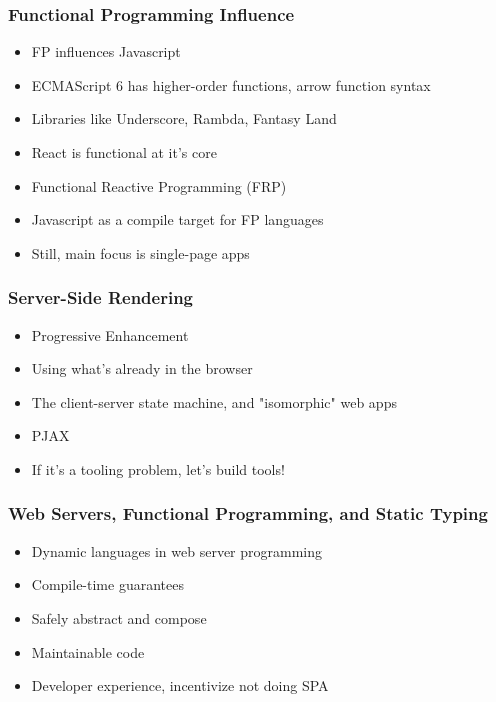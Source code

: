 \begin{frame}
  \frametitle{Functional Programming Influence}
  \begin{itemize}
    \pause
    \item<+-> FP influences Javascript
    \item<+-> ECMAScript 6 has higher-order functions, arrow function syntax
    \item<+-> Libraries like Underscore, Rambda, Fantasy Land
    \item<+-> React is functional at it's core
    \item<+-> Functional Reactive Programming (FRP)
    \item<+-> Javascript as a compile target for FP languages
    \item<+-> Still, main focus is single-page apps
  \end{itemize}
\end{frame}

\begin{frame}
\end{frame}

\begin{frame}
  \frametitle{Server-Side Rendering}
  \begin{itemize}
    \pause
    \item<+-> Progressive Enhancement
    \item<+-> Using what's already in the browser
    \item<+-> The client-server state machine, and "isomorphic" web apps
    \item<+-> PJAX
    \item<+-> If it's a tooling problem, let's build tools!
  \end{itemize}
\end{frame}

\begin{frame}
\end{frame}

\begin{frame}
  \frametitle{Web Servers, Functional Programming, and Static Typing}
  \begin{itemize}
    \pause
    \item<+-> Dynamic languages in web server programming
    \item<+-> Compile-time guarantees
    \item<+-> Safely abstract and compose
    \item<+-> Maintainable code
    \item<+-> Developer experience, incentivize not doing SPA
  \end{itemize}
\end{frame}

